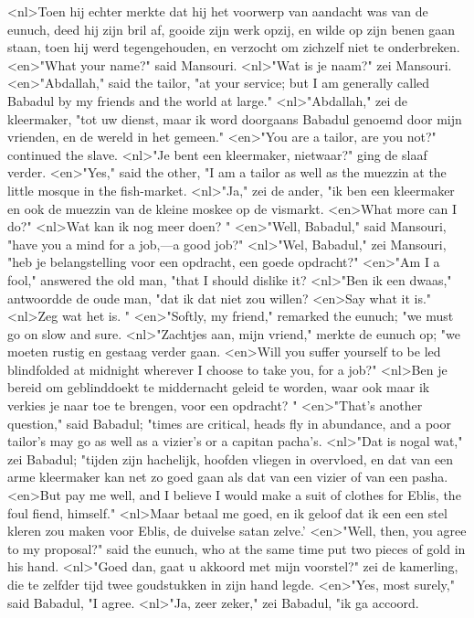 <nl>Toen hij echter merkte dat hij het voorwerp van aandacht was van de eunuch, deed hij zijn bril af, gooide zijn werk opzij, en wilde  op zijn benen gaan staan, toen hij werd tegengehouden, en verzocht om zichzelf niet te onderbreken.
<en>"What your name?" said Mansouri.
<nl>"Wat is je naam?" zei Mansouri.
<en>"Abdallah," said the tailor, "at your service; but I am generally called Babadul by my friends and the world at large."
<nl>"Abdallah," zei de kleermaker, "tot uw dienst, maar ik word doorgaans Babadul genoemd door mijn vrienden, en de wereld in het gemeen."
<en>"You are a tailor, are you not?" continued the slave.
<nl>"Je bent een kleermaker, nietwaar?" ging de slaaf verder.
<en>"Yes," said the other, "I am a tailor as well as the muezzin at the little mosque in the fish-market.
<nl>"Ja," zei de ander, "ik ben een kleermaker en ook de muezzin van de kleine moskee op de vismarkt.
<en>What more can I do?"
<nl>Wat kan ik nog meer doen? "
<en>"Well, Babadul," said Mansouri, "have you a mind for a job,—a good job?"
<nl>"Wel, Babadul," zei Mansouri, "heb je belangstelling voor een opdracht, een goede opdracht?"
<en>"Am I a fool," answered the old man, "that I should dislike it?
<nl>"Ben ik een dwaas," antwoordde de oude man, "dat ik dat niet zou willen?
<en>Say what it is."
<nl>Zeg wat het is. "
<en>"Softly, my friend," remarked the eunuch; "we must go on slow and sure.
<nl>"Zachtjes aan, mijn vriend," merkte de eunuch op; "we moeten rustig en gestaag verder gaan.
<en>Will you suffer yourself to be led blindfolded at midnight wherever I choose to take you, for a job?"
<nl>Ben je bereid om geblinddoekt te middernacht geleid te worden,  waar ook maar ik verkies je naar toe te brengen, voor een opdracht? "
<en>"That's another question," said Babadul; "times are critical, heads fly in abundance, and a poor tailor's may go as well as a vizier's or a capitan pacha's.
<nl>"Dat is nogal wat," zei Babadul; "tijden zijn hachelijk, hoofden vliegen in overvloed, en dat van een arme kleermaker kan net zo goed gaan als dat van een vizier of van een  pasha.
<en>But pay me well, and I believe I would make a suit of clothes for Eblis, the foul fiend, himself."
<nl>Maar betaal me goed, en ik geloof dat ik een een stel kleren zou maken voor Eblis, de duivelse satan zelve.'
<en>"Well, then, you agree to my proposal?" said the eunuch, who at the same time put two pieces of gold in his hand.
<nl>"Goed dan, gaat u akkoord met mijn voorstel?" zei de kamerling, die te zelfder tijd twee goudstukken in zijn hand legde.
<en>"Yes, most surely," said Babadul, "I agree.
<nl>"Ja, zeer zeker," zei Babadul, "ik ga accoord.
